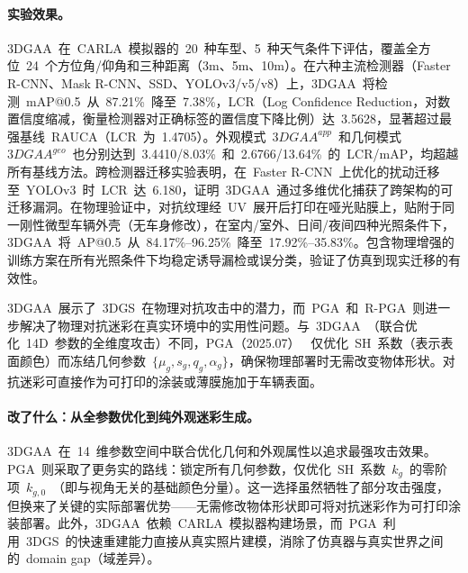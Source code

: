 \paragraph{实验效果。}
3DGAA~在~CARLA~模拟器的~20~种车型、5~种天气条件下评估，覆盖全方位~24~个方位角/仰角和三种距离（3m、5m、10m）。在六种主流检测器（Faster R-CNN、Mask R-CNN、SSD、YOLOv3/v5/v8）上，3DGAA~将检测~mAP@0.5~从~87.21\%~降至~7.38\%，LCR（Log Confidence Reduction，对数置信度缩减，衡量检测器对正确标签的置信度下降比例）达~3.5628，显著超过最强基线~RAUCA（LCR~为~1.4705）。外观模式~$3DGAA^{app}$~和几何模式~$3DGAA^{geo}$~也分别达到~3.4410/8.03\%~和~2.6766/13.64\%~的~LCR/mAP，均超越所有基线方法。跨检测器迁移实验表明，在~Faster R-CNN~上优化的扰动迁移至~YOLOv3~时~LCR~达~6.180，证明~3DGAA~通过多维优化捕获了跨架构的可迁移漏洞。在物理验证中，对抗纹理经~UV~展开后打印在哑光贴膜上，贴附于同一刚性微型车辆外壳（无车身修改），在室内/室外、日间/夜间四种光照条件下，3DGAA~将~AP@0.5~从~84.17\%--96.25\%~降至~17.92\%--35.83\%。包含物理增强的训练方案在所有光照条件下均稳定诱导漏检或误分类，验证了仿真到现实迁移的有效性。

3DGAA~展示了~3DGS~在物理对抗攻击中的潜力，而~PGA~和~R-PGA~则进一步解决了物理对抗迷彩在真实环境中的实用性问题。与~3DGAA~（联合优化~14D~参数的全维度攻击）不同，PGA（2025.07）~\cite{2507_01367} 仅优化~SH~系数（表示表面颜色）而冻结几何参数~$\{\mu_g, s_g, q_g, \alpha_g\}$，确保物理部署时无需改变物体形状。对抗迷彩可直接作为可打印的涂装或薄膜施加于车辆表面。

\paragraph{改了什么：从全参数优化到纯外观迷彩生成。}
3DGAA~在~14~维参数空间中联合优化几何和外观属性以追求最强攻击效果。PGA~则采取了更务实的路线：锁定所有几何参数，仅优化~SH~系数~$k_g$~的零阶项~$k_{g,0}$~（即与视角无关的基础颜色分量）。这一选择虽然牺牲了部分攻击强度，但换来了关键的实际部署优势——无需修改物体形状即可将对抗迷彩作为可打印涂装部署。此外，3DGAA~依赖~CARLA~模拟器构建场景，而~PGA~利用~3DGS~的快速重建能力直接从真实照片建模，消除了仿真器与真实世界之间的~domain gap（域差异）。

